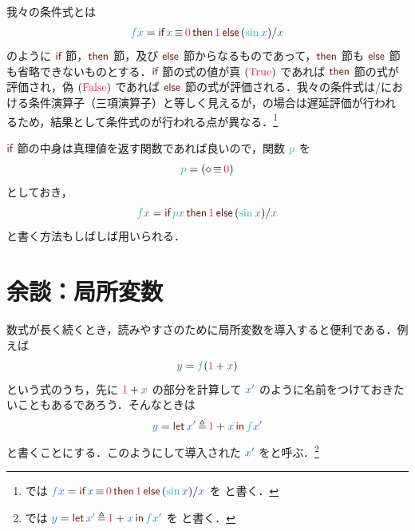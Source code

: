 \documentclass[a5paper,twoside,fleqn,draft]{jsbook}
\begin{document}
我々の条件式とは
\begin{equation}
  \hFunc{f}\hVar{x}
  =\hIfSyntax{\hVar{x}\hIfEq\hConstant{0}}{\hConstant{1}}{{}(\hSin\hVar{x})/\hVar{x}}
\end{equation}
のように $\hIf$ 節，$\hThen$ 節，及び $\hElse$ 節からなるものであって，$\hThen$ 節も $\hElse$ 節も省略できないものとする．$\hIf$ 節の式の値が真 $(\hTrue)$ であれば $\mThen$ 節の式が評価され，偽 $(\hFalse)$ であれば $\hElse$ 節の式が評価される．我々の条件式は\clang/\cxx における条件演算子（三項演算子）と等しく見えるが，\haskell の場合は遅延評価が行われ
るため，結果として条件式のが行われる点が異なる．\footnote{\haskell では $\hFunc{f}\hVar{x}=\hIfSyntax{\hVar{x}\hIfEq\hConstant{0}}{\hConstant{1}}{{}(\hSin\hVar{x})/\hVar{x}}$ を  と書く．}

$\hIf$ 節の中身は真理値を返す関数であれば良いので，関数 $\hFunc{p}$ を
\begin{equation}
  \hFunc{p}
  =(\hAnonParam\hIfEq\hConstant{0})
\end{equation}
としておき，
\begin{equation}
  \hFunc{f}\hVar{x}
  =\hIfSyntax{\hFunc{p}\hVar{x}}{\hConstant{1}}{{}(\hSin\hVar{x})/\hVar{x}}
\end{equation}
と書く方法もしばしば用いられる．


\section{余談：局所変数}

数式が長く続くとき，読みやすさのために局所変数を導入すると便利である．例えば
\begin{equation}
  \hVar{y}
  =\hFunc{f}(\hConstant{1}+\hVar{x})
\end{equation}
という式のうち，先に $\hConstant{1}+\hVar{x}$ の部分を計算して $\hVar{x'}$ のように名前をつけておきたいこともあるであろう．そんなときは
\begin{equation}
  \label{eq:letin}
  \hVar{y}
  =\hLetSyntax{\hVar{x'}\hLetEq\hConstant{1}+\hVar{x}}{\hFunc{f}\hVar{x'}}
\end{equation}
と書くことにする．このようにして導入された $\hVar{x'}$ をと呼ぶ．\footnote{\haskell では $\hVar{y}=\hLetSyntax{\hVar{x'}\hLetEq\hConstant{1}+\hVar{x}}{\hFunc{f}\hVar{x'}}$ を  と書く．}
\end{document}
